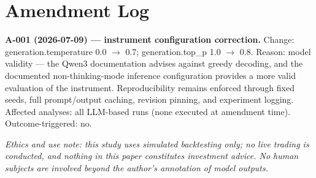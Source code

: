 \documentclass[
  12pt,
]{article}
\begin{document}
\hypertarget{amendment-log}{%
\section{Amendment Log}\label{amendment-log}}

\textbf{A-001 (2026-07-09) --- instrument configuration correction.}
Change: generation.temperature 0.0 \(\rightarrow\) 0.7;
generation.top\_p 1.0 \(\rightarrow\) 0.8. Reason: model validity ---
the Qwen3 documentation advises against greedy decoding, and the
documented non-thinking-mode inference configuration provides a more
valid evaluation of the instrument. Reproducibility remains enforced
through fixed seeds, full prompt/output caching, revision pinning, and
experiment logging. Affected analyses: all LLM-based runs (none executed
at amendment time). Outcome-triggered: no.

\emph{Ethics and use note: this study uses simulated backtesting only;
no live trading is conducted, and nothing in this paper constitutes
investment advice. No human subjects are involved beyond the author's
annotation of model outputs.}
\end{document}
